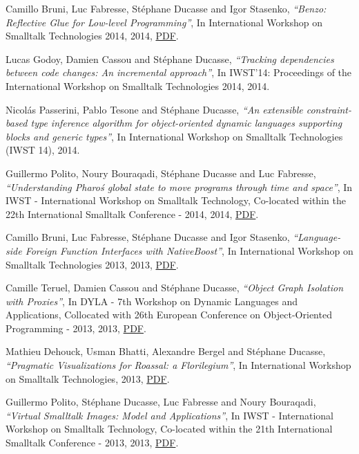 \documentclass{article}
\newcommand{\czauthors}[1]{#1}
\newcommand{\cztitle}[1]{\emph{``#1''}}
\newcommand{\czbooktitle}[1]{#1}
\begin{document}
\begin{itemize}
	\pub  \czauthors{Camillo Bruni, Luc Fabresse, St\'ephane Ducasse and Igor Stasenko},  \cztitle{Benzo: Reflective Glue for Low-level Programming},  In \czbooktitle{International Workshop on Smalltalk Technologies 2014}, 2014, \href{http://rmod-files.lille.inria.fr/Team/Texts/Papers/Brun14a-IWST-Benzo.pdf}{PDF}.

	\pub  \czauthors{Lucas Godoy, Damien Cassou and St\'ephane Ducasse},  \cztitle{Tracking dependencies between code changes: An incremental approach},  In \czbooktitle{IWST'14: Proceedings of the	International Workshop on Smalltalk Technologies 2014}, 2014.

	\pub  \czauthors{Nicol\'{a}s Passerini, Pablo Tesone and St\'ephane Ducasse},  \cztitle{An extensible constraint-based type inference algorithm for object-oriented dynamic languages supporting blocks and generic types},  In \czbooktitle{International Workshop on Smalltalk Technologies (IWST 14)}, 2014.

	\pub  \czauthors{Guillermo Polito, Noury Bouraqadi, St\'ephane Ducasse and Luc Fabresse},  \cztitle{Understanding Pharo\'s global state to move programs through time and space},  In \czbooktitle{IWST - International Workshop on Smalltalk Technology, Co-located within the 22th International Smalltalk Conference - 2014}, 2014, \href{http://rmod-files.lille.inria.fr/Team/Texts/Papers/Poli14b-IWST-GlobalStateClassification.pdf}{PDF}.

	\pub  \czauthors{Camillo Bruni, Luc Fabresse, St\'ephane Ducasse and Igor Stasenko},  \cztitle{Language-side Foreign Function Interfaces with NativeBoost},  In \czbooktitle{International Workshop on Smalltalk Technologies 2013}, 2013, \href{http://rmod-files.lille.inria.fr/Team/Texts/Papers/Brun13a-NativeBoostIWST.pdf}{PDF}.

	\pub  \czauthors{Camille Teruel, Damien Cassou and St\'ephane Ducasse},  \cztitle{{Object Graph Isolation with Proxies}},  In \czbooktitle{{DYLA - 7th Workshop on Dynamic Languages and Applications, Collocated with 26th European Conference on Object-Oriented Programming - 2013}}, 2013, \href{http://hal.inria.fr/hal-00834320/PDF/main.pdf}{PDF}.

	\pub  \czauthors{Mathieu Dehouck, Usman Bhatti, Alexandre Bergel and St\'ephane Ducasse},  \cztitle{Pragmatic Visualizations for Roassal: a Florilegium},  In \czbooktitle{International Workshop on Smalltalk Technologies}, 2013, \href{http://rmod-files.lille.inria.fr/Team/Texts/Papers/Deho13a-IWST2013-AlgoRoassal.pdf}{PDF}.

	\pub  \czauthors{Guillermo Polito, St\'ephane Ducasse, Luc Fabresse and Noury Bouraqadi},  \cztitle{Virtual Smalltalk Images: Model and Applications},  In \czbooktitle{IWST - International Workshop on Smalltalk Technology, Co-located within the 21th International Smalltalk Conference - 2013}, 2013, \href{http://rmod-files.lille.inria.fr/Team/Texts/Papers/Poli13a-IWST13-ObjectSpacesVirtualization.pdf}{PDF}.


\end{itemize}
\end{document}
